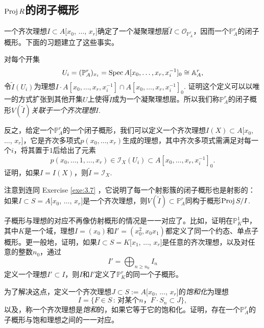 \subsection{\texorpdfstring{$\operatorname{Proj} R$}{Proj R}的闭子概形}\label{s:3.2.2}

一个齐次理想$I\subset A[x_0$, $\dots$, $x_r]$确定了一个凝聚理想层$\tilde I\subset \mathscr O_{\mathbb P_A^r}$，因而一个$\mathbb P_A^r$的闭子概形。下面的习题建立了这些事实。

\begin{exe}\label{exe:3.13}
对每个开集
\[
	U_i=(\mathbb P_A^r)_{x_i}=\operatorname{Spec} A[x_0,\dots,x_r,x_i^{-1}]_0\cong \mathbb A_A^r,
\]
令$\tilde I(U_i)$为理想$I\cdot A[x_0,\dots,x_r,x_i^{-1}]\cap A[x_0,\dots,x_r,x_i^{-1}]_0$. 证明这个定义可以以唯一的方式扩张到其他开集$U$上使得$\tilde{I}$成为一个凝聚理想层。所以我们称$\mathbb P_A^r$的闭子概形$V(\tilde{I})$\textit{关联于一个齐次理想$I$}.
\end{exe}

\begin{exe}\label{exe:3.14}
反之，给定一个$\mathbb P_A^r$的一个闭子概形，我们可以定义一个齐次理想$I(X)\subset A[x_0$, $\dots$, $x_r]$，它是齐次多项式$p(x_0,\dots,x_r)$生成的理想，其中齐次多项式需满足对每一个$i$，将其置于$1$后给出了元素
\[
	p(x_0,\dots,1,\dots,x_r)\in \mathscr I_X(U_i)\subset A[x_0,\dots,x_r,x_i^{-1}]_0.
\]
证明，如果$I=I(X)$，则$\tilde I=\mathscr I_X$.
\end{exe}

注意到连同 Exercise \ref{exe:3.7} ，它说明了每一个射影簇的闭子概形也是射影的：如果$I\subset S=A[x_0$, $\dots$, $x_r]$是一个齐次理想，则$V(\tilde{I})\subset \mathbb P^r_A$同构于概形$\operatorname{Proj} S/I$.

\begin{exe}\label{exe:3.15}
子概形与理想的对应不再像仿射概形的情况是一一对应了。比如，证明在$\mathbb P_K^1$中，其中$K$是一个域，理想$I=(x_0)$和$I'=(x_0^2,x_0x_1)$都定义了同一个约态、单点子概形。更一般地，证明，如果$I\subset S=K[x_1$, $\dots$, $x_r]$是任意的齐次理想，以及对任意的整数$n_0$，通过
\[
	I'=\bigoplus_{n\geq n_0}I_n
\]
定义一个理想$I'\subset I$，则$I$和$I'$定义了$\mathbb P_K^r$的同一个子概形。
\end{exe}

\begin{exe}\label{exe:3.16}
为了解决这点，定义一个齐次理想$J\subset S:=A[x_0$, $\dots$, $x_r]$的\textit{饱和化}为理想
\[
	I=\{F\in S\,:\, \text{对某个$n$，$F\cdot S_n\subset J$}\},
\]
以及，称一个齐次理想是\textit{饱和}的，如果它等于它的饱和化。证明，存在一个$\mathbb P_A^r$的子概形与饱和理想之间的一一对应。
\end{exe}

